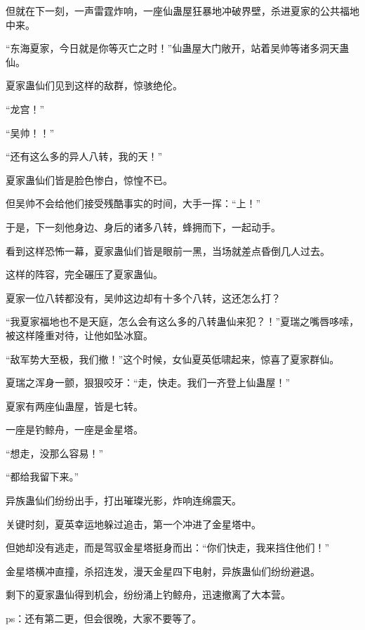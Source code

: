 \begin{this_body}
但就在下一刻，一声雷霆炸响，一座仙蛊屋狂暴地冲破界壁，杀进夏家的公共福地中来。

“东海夏家，今日就是你等灭亡之时！”仙蛊屋大门敞开，站着吴帅等诸多洞天蛊仙。

夏家蛊仙们见到这样的敌群，惊骇绝伦。

“龙宫！”

“吴帅！！”

“还有这么多的异人八转，我的天！”

夏家蛊仙们皆是脸色惨白，惊惶不已。

但吴帅不会给他们接受残酷事实的时间，大手一挥：“上！”

于是，下一刻他身边、身后的诸多八转，蜂拥而下，一起动手。

看到这样恐怖一幕，夏家蛊仙们皆是眼前一黑，当场就差点昏倒几人过去。

这样的阵容，完全碾压了夏家蛊仙。

夏家一位八转都没有，吴帅这边却有十多个八转，这还怎么打？

“我夏家福地也不是天庭，怎么会有这么多的八转蛊仙来犯？！”夏瑞之嘴唇哆嗦，被这样隆重对待，让他如坠冰窟。

“敌军势大至极，我们撤！”这个时候，女仙夏英低啸起来，惊喜了夏家群仙。

夏瑞之浑身一颤，狠狠咬牙：“走，快走。我们一齐登上仙蛊屋！”

夏家有两座仙蛊屋，皆是七转。

一座是钓鲸舟，一座是金星塔。

“想走，没那么容易！”

“都给我留下来。”

异族蛊仙们纷纷出手，打出璀璨光影，炸响连绵震天。

关键时刻，夏英幸运地躲过追击，第一个冲进了金星塔中。

但她却没有逃走，而是驾驭金星塔挺身而出：“你们快走，我来挡住他们！”

金星塔横冲直撞，杀招连发，漫天金星四下电射，异族蛊仙们纷纷避退。

剩下的夏家蛊仙得到机会，纷纷涌上钓鲸舟，迅速撤离了大本营。

ps：还有第二更，但会很晚，大家不要等了。

\end{this_body}

